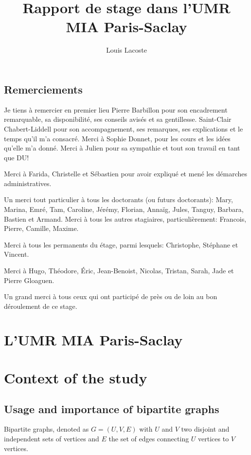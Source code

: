 \documentclass[12pt,a4paper]{report}
\title{Rapport de stage dans l'UMR MIA Paris-Saclay}
\author{Louis Lacoste}
\begin{document}
\maketitle
\tableofcontents

\section{Remerciements}

Je tiens à remercier en premier lieu Pierre Barbillon pour son encadrement
remarquable, sa disponibilité, ses conseils avisés et sa gentillesse.
Saint-Clair Chabert-Liddell pour son accompagnement, ses remarques,
ses explications et le temps qu'il m'a consacré. Merci à Sophie Donnet, pour les
cours et les idées qu'elle m'a donné. Merci à Julien pour sa sympathie et tout
son travail en tant que DU!

Merci à Farida, Christelle et Sébastien pour avoir expliqué et mené les
démarches administratives.

Un merci tout particulier à tous les doctorants (ou futurs doctorants): Mary,
Marina, Emré, Tam, Caroline, Jérémy, Florian, Annaïg, Jules, Tanguy, Barbara,
Bastien et Armand.
Merci à tous les autres stagiaires, particulièrement: Francois, Pierre,
Camille, Maxime.

Merci à tous les permanents du  étage, parmi lesquels: Christophe,
Stéphane et Vincent.

Merci à Hugo, Théodore, Éric, Jean-Benoist, Nicolas, Tristan, Sarah, Jade et
Pierre Gloaguen.

Un grand merci à tous ceux qui ont participé de près ou de loin au bon
déroulement de ce stage.


\chapter{L'UMR MIA Paris-Saclay}



\chapter{Context of the study}

\section{Usage and importance of bipartite graphs}
\label{sec:usage-and-importance-of-bipartite-graphs}
Bipartite graphs, denoted as $G = (U,V,E)$ with $U$ and $V$ two disjoint and
independent sets of vertices and $E$ the set of edges connecting $U$ vertices to
$V$ vertices.
\end{document}
